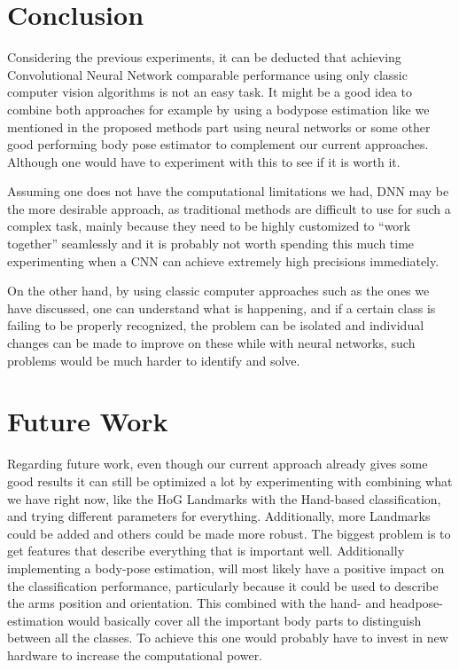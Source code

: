 \documentclass[10pt,twocolumn,letterpaper]{article}
\begin{document}
\section{Conclusion}
Considering the previous experiments, it can be deducted that achieving Convolutional Neural Network comparable performance using only classic computer vision algorithms is not an easy task. It might be a good idea to combine both approaches for example by using a bodypose estimation like we mentioned in the proposed methods part using neural networks or some other good performing body pose estimator to complement our current approaches. Although one would have to experiment with this to see if it is worth it.

Assuming one does not have the computational limitations we had, DNN may be the more desirable approach, as traditional methods are difficult to use for such a complex task, mainly because they need to be highly customized to ``work together'' seamlessly and it is probably not worth spending this much time experimenting when a CNN can achieve extremely high precisions immediately. 

On the other hand, by using classic computer approaches such as the ones we have discussed, one can understand what is happening, and if a certain class is failing to be properly recognized, the problem can be isolated and individual changes can be made to improve on these while with neural networks, such problems would be much harder to identify and solve.


\section{Future Work}
Regarding future work, even though our current approach already gives some good results it can still be optimized a lot by experimenting with combining what we have right now, like the HoG Landmarks with the Hand-based classification, and trying different parameters for everything. Additionally, more Landmarks could be added and others could be made more robust. The biggest problem is to get features that describe everything that is important well. Additionally implementing a body-pose estimation, will most likely have a positive impact on the classification performance, particularly because it could be used to describe the arms position and orientation. This combined with the hand- and headpose-estimation would basically cover all the important body parts to distinguish between all the classes. To achieve this one would probably have to invest in new hardware to increase the computational power.





{\small


}
\end{document}
